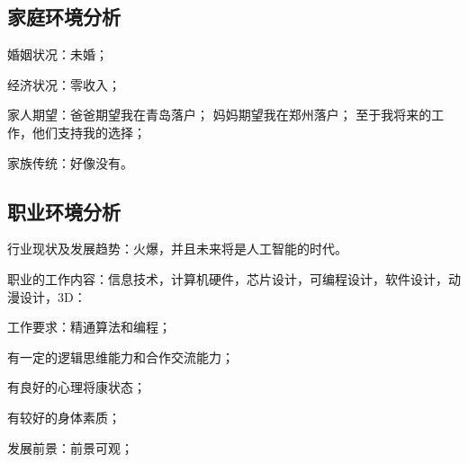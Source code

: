 \documentclass{article}
\begin{document}
\par
\subsection{家庭环境分析}

婚姻状况：未婚；\par
经济状况：零收入；\par
家人期望：爸爸期望我在青岛落户；
         妈妈期望我在郑州落户；
         至于我将来的工作，他们支持我的选择；\par
家族传统：好像没有。\par
\par
\subsection{职业环境分析}
行业现状及发展趋势：火爆，并且未来将是人工智能的时代。\par
职业的工作内容：信息技术，计算机硬件，芯片设计，可编程设计，软件设计，动漫设计，3D：\par
工作要求：精通算法和编程；\par
有一定的逻辑思维能力和合作交流能力；\par
有良好的心理将康状态；\par
有较好的身体素质；\par
发展前景：前景可观；\par
\par
\end{document}
